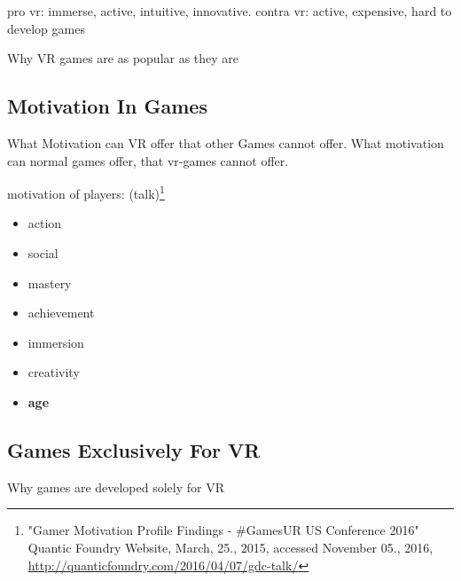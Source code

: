 pro vr: immerse, active, intuitive, innovative.
contra vr: active, expensive, hard to develop games

Why VR games are as popular as they are


\subsection{Motivation In Games}
What Motivation can VR offer that other Games cannot offer. What motivation can normal games offer, that vr-games cannot offer.

motivation of players: (talk)\footnote{"Gamer Motivation Profile Findings - \#GamesUR US Conference 2016" Quantic Foundry Website, March, 25., 2015, accessed November 05., 2016, \url{http://quanticfoundry.com/2016/04/07/gdc-talk/}}
\begin{itemize}
	\item action
	\item social
	\item mastery
	\item achievement
	\item immersion
	\item creativity
	\item \textbf{age}
\end{itemize}

\subsection{Games Exclusively For VR}
Why games are developed solely for VR
